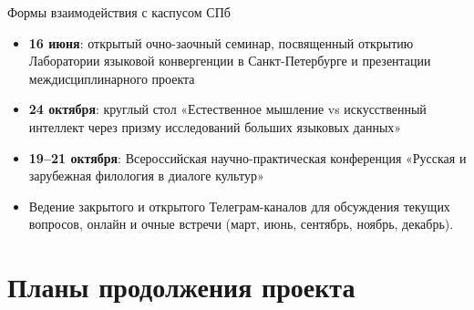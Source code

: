 \documentclass[
  13pt,
  ignorenonframetext,
]{beamer}
\providecommand{\tightlist}{%
  \setlength{\itemsep}{0pt}\setlength{\parskip}{0pt}}\usepackage{longtable,booktabs,array}
\begin{document}
\begin{frame}{Формы взаимодействия с каспусом СПб}
\label{ux444ux43eux440ux43cux44b-ux432ux437ux430ux438ux43cux43eux434ux435ux439ux441ux442ux432ux438ux44f-ux441-ux43aux430ux441ux43fux443ux441ux43eux43c-ux441ux43fux431}
\begin{itemize}
\tightlist
\item
  \textbf{16 июня}: открытый очно-заочный семинар, посвященный открытию
  Лаборатории языковой конвергенции в Санкт-Петербурге и презентации
  междисциплинарного проекта
\item
  \textbf{24 октября}: круглый стол «Естественное мышление vs
  искусственный интеллект через призму исследований больших языковых
  данных»
\item
  \textbf{19--21 октября}: Всероссийская научно-практическая конференция
  «Русская и зарубежная филология в диалоге культур»
\item
  Ведение закрытого и открытого Телеграм-каналов для обсуждения текущих
  вопросов, онлайн и очные встречи (март, июнь, сентябрь, ноябрь,
  декабрь).
\end{itemize}
\end{frame}

\section{Планы продолжения
проекта}\label{ux43fux43bux430ux43dux44b-ux43fux440ux43eux434ux43eux43bux436ux435ux43dux438ux44f-ux43fux440ux43eux435ux43aux442ux430}
\end{document}
